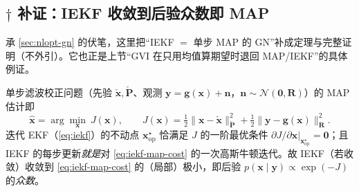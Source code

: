 \subsection{\texorpdfstring{$\dagger$}{x} 补证：IEKF 收敛到后验众数即 MAP}
\label{sec:nlopt-gvi-iekf}

承 \cref{sec:nlopt-gn} 的伏笔，这里把“IEKF $=$ 单步 MAP 的 GN”补成定理与完整证明（不外引）。它也正是上节“GVI 在只用均值算期望时退回 MAP/IEKF”的具体例证。

\begin{theorem}[IEKF 收敛到后验众数（$=$ 单步 MAP）]\label{thm:nlopt-iekf-map}
单步滤波校正问题（先验 $\check{\mathbf{x}},\check{\mathbf{P}}$、观测 $\mathbf{y}=\mathbf{g}(\mathbf{x})+\mathbf{n}$，$\mathbf{n}\sim\mathcal{N}(\mathbf{0},\mathbf{R})$）的 MAP 估计即
\begin{equation}
  \hat{\mathbf{x}}=\arg\min_{\mathbf{x}}\ J(\mathbf{x}),\qquad
  J(\mathbf{x})=\tfrac12\|\mathbf{x}-\check{\mathbf{x}}\|_{\check{\mathbf{P}}}^2+\tfrac12\|\mathbf{y}-\mathbf{g}(\mathbf{x})\|_{\mathbf{R}}^2.
  \label{eq:iekf-map-cost}
\end{equation}
迭代 EKF（\cref{eq:iekf}）的不动点 $\mathbf{x}_{\mathrm{op}}^\star$ 恰满足 $J$ 的一阶最优条件 $\partial J/\partial\mathbf{x}|_{\mathbf{x}_{\mathrm{op}}^\star}=\mathbf{0}$；且 IEKF 的每步更新\emph{就是}对 \cref{eq:iekf-map-cost} 的一次高斯牛顿迭代。故 IEKF（若收敛）收敛到 \cref{eq:iekf-map-cost} 的（局部）极小，即后验 $p(\mathbf{x}\mid\mathbf{y})\propto\exp(-J)$ 的\emph{众数}。
\end{theorem}
